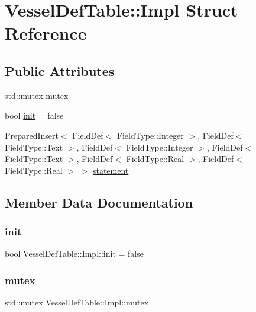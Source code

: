 \hypertarget{struct_vessel_def_table_1_1_impl}{}\section{Vessel\+Def\+Table\+::Impl Struct Reference}
\label{struct_vessel_def_table_1_1_impl}
\subsection*{Public Attributes}
\begin{DoxyCompactItemize}
\item 
std\+::mutex \mbox{\hyperlink{struct_vessel_def_table_1_1_impl_ad1b9ee05f01d9882479ff40fd4646510}{mutex}}
\item 
bool \mbox{\hyperlink{struct_vessel_def_table_1_1_impl_a059769ce423994fc5f10314dbb893a47}{init}} = false
\item 
Prepared\+Insert$<$ Field\+Def$<$ Field\+Type\+::\+Integer $>$, Field\+Def$<$ Field\+Type\+::\+Text $>$, Field\+Def$<$ Field\+Type\+::\+Integer $>$, Field\+Def$<$ Field\+Type\+::\+Text $>$, Field\+Def$<$ Field\+Type\+::\+Real $>$, Field\+Def$<$ Field\+Type\+::\+Real $>$ $>$ \mbox{\hyperlink{struct_vessel_def_table_1_1_impl_a0d4fd618465d7888a666dcd6aed73614}{statement}}
\end{DoxyCompactItemize}


\subsection{Member Data Documentation}
\mbox{\label{struct_vessel_def_table_1_1_impl_a059769ce423994fc5f10314dbb893a47}} 
\subsubsection{\texorpdfstring{init}{init}}
{\footnotesize\ttfamily bool Vessel\+Def\+Table\+::\+Impl\+::init = false}

\mbox{\label{struct_vessel_def_table_1_1_impl_ad1b9ee05f01d9882479ff40fd4646510}} 
\subsubsection{\texorpdfstring{mutex}{mutex}}
{\footnotesize\ttfamily std\+::mutex Vessel\+Def\+Table\+::\+Impl\+::mutex}

